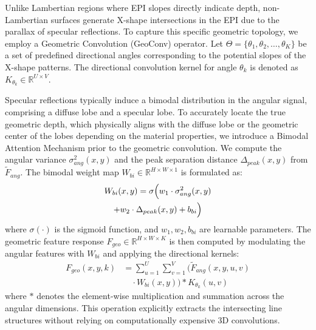 \documentclass[lettersize,journal]{IEEEtran}
\begin{document}
Unlike Lambertian regions where EPI slopes directly indicate depth, non-Lambertian surfaces generate X-shape intersections in the EPI due to the parallax of specular reflections. To capture this specific geometric topology, we employ a Geometric Convolution (GeoConv) operator. Let $\Theta = \{\theta_1, \theta_2, \dots, \theta_K\}$ be a set of predefined directional angles corresponding to the potential slopes of the X-shape patterns. The directional convolution kernel for angle $\theta_k$ is denoted as $K_{\theta_k} \in \mathbb{R}^{U \times V}$. 

Specular reflections typically induce a bimodal distribution in the angular signal, comprising a diffuse lobe and a specular lobe. To accurately locate the true geometric depth, which physically aligns with the diffuse lobe or the geometric center of the lobes depending on the material properties, we introduce a Bimodal Attention Mechanism prior to the geometric convolution. We compute the angular variance $\sigma^2_{ang}(x,y)$ and the peak separation distance $\Delta_{peak}(x,y)$ from $\tilde{F}_{ang}$. The bimodal weight map $W_{bi} \in \mathbb{R}^{H \times W \times 1}$ is formulated as:
\begin{multline}

W_{bi}(x, y) = \sigma \Bigl( w_1 \cdot \sigma^2_{ang}(x, y) \\
+ w_2 \cdot \Delta_{peak}(x, y) + b_{bi} \Bigr)
\end{multline}
where $\sigma(\cdot)$ is the sigmoid function, and $w_1, w_2, b_{bi}$ are learnable parameters. The geometric feature response $F_{geo} \in \mathbb{R}^{H \times W \times K}$ is then computed by modulating the angular features with $W_{bi}$ and applying the directional kernels:
\begin{equation}
\begin{aligned}
F_{geo}(x, y, k) &= \sum_{u=1}^U \sum_{v=1}^V \Big( \tilde{F}_{ang}(x, y, u, v) \\
&\quad \cdot W_{bi}(x, y) \Big) * K_{\theta_k}(u, v)
\end{aligned}
\end{equation}
where $*$ denotes the element-wise multiplication and summation across the angular dimensions. This operation explicitly extracts the intersecting line structures without relying on computationally expensive 3D convolutions.
\end{document}
